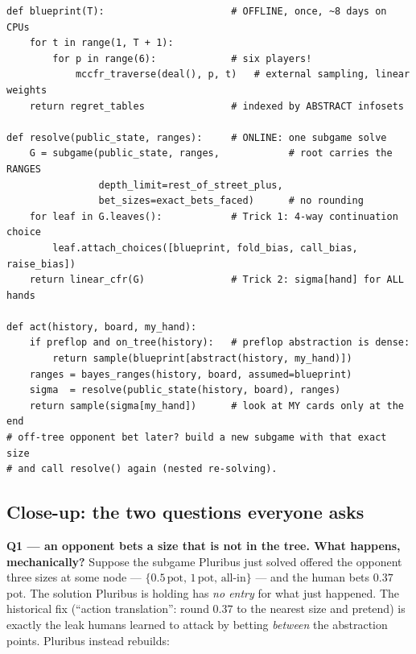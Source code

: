 \documentclass[11pt,a4paper]{article}
\begin{document}
\begin{lstlisting}[style=py, caption={Pluribus, schematically. The blueprint is Deep CFR's ancestor (same traversals, tables instead of nets); play time adds range-aware, depth-limited re-solving.}]
def blueprint(T):                      # OFFLINE, once, ~8 days on CPUs
    for t in range(1, T + 1):
        for p in range(6):             # six players!
            mccfr_traverse(deal(), p, t)   # external sampling, linear weights
    return regret_tables               # indexed by ABSTRACT infosets

def resolve(public_state, ranges):     # ONLINE: one subgame solve
    G = subgame(public_state, ranges,            # root carries the RANGES
                depth_limit=rest_of_street_plus,
                bet_sizes=exact_bets_faced)      # no rounding
    for leaf in G.leaves():            # Trick 1: 4-way continuation choice
        leaf.attach_choices([blueprint, fold_bias, call_bias, raise_bias])
    return linear_cfr(G)               # Trick 2: sigma[hand] for ALL hands

def act(history, board, my_hand):
    if preflop and on_tree(history):   # preflop abstraction is dense:
        return sample(blueprint[abstract(history, my_hand)])
    ranges = bayes_ranges(history, board, assumed=blueprint)
    sigma  = resolve(public_state(history, board), ranges)
    return sample(sigma[my_hand])      # look at MY cards only at the end
# off-tree opponent bet later? build a new subgame with that exact size
# and call resolve() again (nested re-solving).
\end{lstlisting}

\subsection{Close-up: the two questions everyone asks}

\textbf{Q1 --- an opponent bets a size that is not in the tree. What happens,
mechanically?} Suppose the subgame Pluribus just solved offered the opponent
three sizes at some node --- $\{0.5\,\text{pot},\, 1\,\text{pot},\,
\text{all-in}\}$ --- and the human bets $0.37$ pot. The solution Pluribus is
holding has \emph{no entry} for what just happened. The historical fix
(``action translation'': round $0.37$ to the nearest size and pretend) is
exactly the leak humans learned to attack by betting \emph{between} the
abstraction points. Pluribus instead rebuilds:
\end{document}
